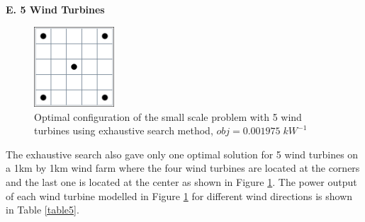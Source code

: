     \textbf{E. 5 Wind Turbines}
        \begin{figure}[H]
            \centering
            \includegraphics[width=3cm]{Figures/Chromosomes/5.png}
            \caption{Optimal configuration of the small scale problem with 5 wind turbines using exhaustive search method, $obj=0.001975\;kW^{-1}$}
            \label{small5}
        \end{figure}
    
        The exhaustive search also gave only one optimal solution for 5 wind turbines on a 1km by 1km wind farm where the four wind turbines are located at the corners and the last one is located at the center as shown in Figure \ref{small5}. The power output of each wind turbine modelled in Figure \ref{small5} for different wind directions is shown in Table \ref{table5}.
        
